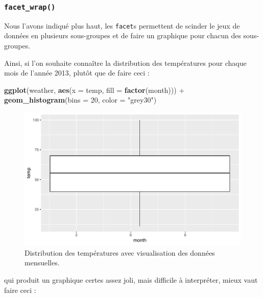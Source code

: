 \documentclass[a4paperpaper,]{article}
\newenvironment{Shaded}{\begin{snugshade}}{\end{snugshade}}
\newcommand{\DataTypeTok}[1]{\textcolor[rgb]{0.00,0.34,0.68}{#1}}
\newcommand{\DecValTok}[1]{\textcolor[rgb]{0.69,0.50,0.00}{#1}}
\newcommand{\KeywordTok}[1]{\textcolor[rgb]{0.12,0.11,0.11}{\textbf{#1}}}
\newcommand{\NormalTok}[1]{\textcolor[rgb]{0.12,0.11,0.11}{#1}}
\newcommand{\OperatorTok}[1]{\textcolor[rgb]{0.12,0.11,0.11}{#1}}
\newcommand{\StringTok}[1]{\textcolor[rgb]{0.75,0.01,0.01}{#1}}
\theoremstyle{definition}
\theoremstyle{definition}
\theoremstyle{definition}
\theoremstyle{remark}
\begin{document}
\hypertarget{facet_wrap}{%
\subsubsection{\texorpdfstring{\texttt{facet\_wrap()}}{facet\_wrap()}}\label{facet_wrap}}

Nous l'avons indiqué plus haut, les \texttt{facet}s permettent de
scinder le jeux de données en plusieurs sous-groupes et de faire un
graphique pour chacun des sous-groupes.

Ainsi, si l'on souhaite connaître la distribution des températures pour
chaque mois de l'année 2013, plutôt que de faire ceci :

\begin{Shaded}
\begin{Highlighting}[]
\KeywordTok{ggplot}\NormalTok{(weather, }\KeywordTok{aes}\NormalTok{(}\DataTypeTok{x =}\NormalTok{ temp, }\DataTypeTok{fill =} \KeywordTok{factor}\NormalTok{(month))) }\OperatorTok{+}
\StringTok{  }\KeywordTok{geom_histogram}\NormalTok{(}\DataTypeTok{bins =} \DecValTok{20}\NormalTok{, }\DataTypeTok{color =} \StringTok{"grey30"}\NormalTok{)}
\end{Highlighting}
\end{Shaded}

\begin{figure}[htpb]

{\centering \includegraphics[width=0.9\linewidth]{figure/unnamed-chunk-54-1} 

}

\caption{Distribution des températures avec visualisation des données mensuelles.}\label{fig:unnamed-chunk-54}
\end{figure}

qui produit un graphique certes assez joli, mais difficile à
interpréter, mieux vaut faire ceci :
\end{document}

